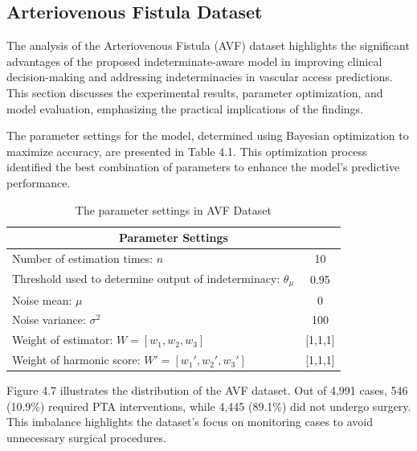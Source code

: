 \subsection{Arteriovenous Fistula Dataset}%

The analysis of the Arteriovenous Fistula (AVF) dataset highlights the significant advantages of the proposed indeterminate-aware model in improving clinical decision-making and addressing indeterminacies in vascular access predictions. This section discusses the experimental results, parameter optimization, and model evaluation, emphasizing the practical implications of the findings.

The parameter settings for the model, determined using Bayesian optimization to maximize accuracy, are presented in Table 4.1. This optimization process identified the best combination of parameters to enhance the model’s predictive performance. 

\begin{table}[H]
    \centering
    \caption{The parameter settings in AVF Dataset}
    \renewcommand{\arraystretch}{1} %
    \begin{tabular}[h]{lc} \hline 
        \multicolumn{2}{c}{Parameter Settings} \\ \hline
        Number of estimation times: \(n\) & 10\\ 
        Threshold used to determine output of indeterminacy: \(\theta_{\mu}\) &  0.95\\ 
        Noise mean: \(\mu\) & 0\\ 
        Noise variance: \(\sigma^2\) & 100\\
        Weight of estimator: \(W=[w_{1},w_{2},w_{3}]\) & [1,1,1]\\
        Weight of harmonic score: \(W'=[w_1',w_2',w_3']\) & [1,1,1] \\ \hline 
    \end{tabular}
    \label{tab:Experimental_Config_AVF}
\end{table}

Figure 4.7 illustrates the distribution of the AVF dataset. Out of 4,991 cases, 546 (10.9\%) required PTA interventions, while 4,445 (89.1\%) did not undergo surgery. This imbalance highlights the dataset’s focus on monitoring cases to avoid unnecessary surgical procedures.

